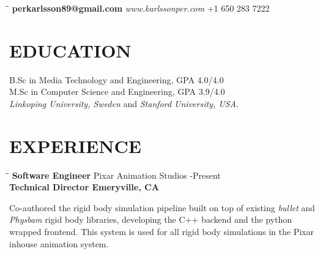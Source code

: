 \documentclass{res}
\begin{document}
 





\begin{resume}     
\vspace{-20pt} 
\begin{tabbing}
   \hspace{2.3in}\= \hspace{2.3in}\= \kill %
    {\bf perkarlsson89@gmail.com}   \>\emph{www.karlssonper.com}  \>+1 650 283 7222 \\
\end{tabbing}\vspace{-20pt}

\section{EDUCATION}
    B.Sc in Media Technology and Engineering, GPA 4.0/4.0\\ 
    M.Sc in Computer Science and Engineering, GPA 3.9/4.0\\ 
   \emph{Linkoping University, Sweden} and \emph{Stanford University, USA}.
 
\section{EXPERIENCE}
   \vspace{-0.1in}	
   \begin{tabbing}
   \hspace{2.3in}\= \hspace{2.7in}\= \kill %
    {\bf Software Engineer} \>Pixar Animation Studios     -Present\\
     \bf Technical Director    \>Emeryville, CA
   \end{tabbing}\vspace{-20pt}      %
    Co-authored the rigid body simulation pipeline built on top of existing \emph{bullet} and \emph{Physbam} rigid body libraries, developing the C++ backend and the python wrapped frontend. This system is used for all rigid body simulations in the Pixar inhouse animation system.


\end{resume}
\end{document}

